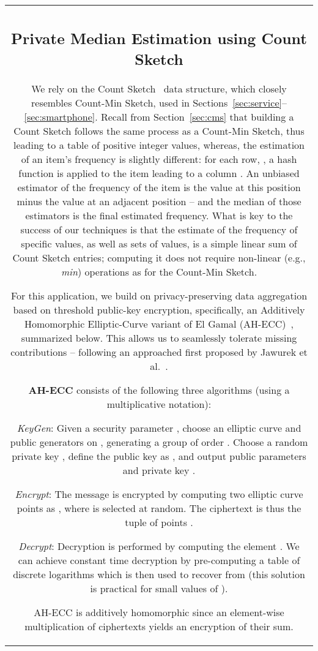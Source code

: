 \documentclass[conference]{IEEEtran}
\newcommand{\descr}[1]{\medskip \noindent \textbf{#1}}
\begin{document}
\begin{figure*}[ht!]
{\begin{tabular}{|c|}
\subsection{Private Median Estimation using Count Sketch}
We rely on the Count Sketch~\cite{charikar2002finding} data structure, which closely resembles Count-Min Sketch, used in Sections~\ref{sec:service}--\ref{sec:smartphone}. Recall from Section~\ref{sec:cms} that building a Count Sketch follows the same process as a Count-Min Sketch, thus leading to a  table of positive integer values, whereas, the estimation of an item's frequency is slightly different: for each row, , a hash function is applied to the item leading to a column . An unbiased estimator of the frequency of the item is the value at this position minus the value at an adjacent position -- and the median of those estimators is the final estimated frequency. What is key to the success of our techniques is that the estimate of the frequency of specific values, as well as sets of values, is a simple linear sum of Count Sketch entries; computing it does not require non-linear (e.g., \emph{min}) operations as for the Count-Min Sketch. 


For this application, we build on privacy-preserving data aggregation based on threshold public-key encryption, 
specifically, an Additively Homomorphic Elliptic-Curve variant of El Gamal (AH-ECC)~\cite{benaloh1994dense}, summarized below. 
This allows us to seamlessly tolerate missing contributions -- following an approached first proposed by Jawurek et al.~\cite{jawurek2012fault}.

\descr{AH-ECC} consists of the following three algorithms (using a multiplicative notation):
\begin{compactenum}
\item {\em KeyGen}: Given a security parameter , choose an elliptic curve  and  public generators on , generating a group of order . Choose a random private key , define the public key as , and output public parameters  and private key . 
\item {\em Encrypt}: The message  is encrypted by computing two elliptic curve points as 
, where  is selected at random. The ciphertext is thus the tuple of points .
\item {\em Decrypt}: Decryption is performed by computing the element . We can achieve constant time decryption by pre-computing a table of discrete logarithms which is then used to recover  from  (this solution is practical  for small values of ).
\end{compactenum}
AH-ECC is additively homomorphic since an element-wise multiplication of ciphertexts yields an encryption of their sum.


\end{tabular}}
\end{figure*}
\end{document}
